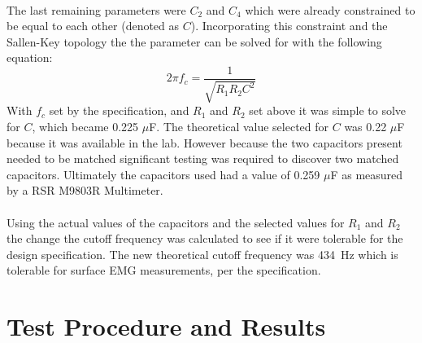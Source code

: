 \documentclass[justified,nobib]{tufte-handout}
\begin{document}
\paragraph{} The last remaining parameters were $C_2$ and $C_4$ which were
already constrained to be equal to each other (denoted as $C$). Incorporating
this constraint and the Sallen-Key topology the the parameter can be solved for
with the following equation:
\begin{equation}
2\pi f_c = \frac{1}{\sqrt{R_1R_2C^2}}
\end{equation}
With $f_c$ set by the specification, and $R_1$ and $R_2$ set above it was simple
to solve for $C$, which became 0.225 $\mu$F. The theoretical value selected
for $C$ was 0.22 $\mu$F because it was available in the lab. However because the
two capacitors present needed to be matched significant testing was required to
discover two matched capacitors. Ultimately the capacitors used had a value of
0.259 $\mu$F as measured by a RSR M9803R Multimeter. 
\paragraph{} Using the actual values of the capacitors and the selected values
for $R_1$ and $R_2$ the change the cutoff frequency was calculated to see if it
were tolerable for the design specification. The new theoretical cutoff
frequency was 434~Hz which is tolerable for surface EMG measurements, per the
specification. 
\section{Test Procedure and Results}
\end{document}
